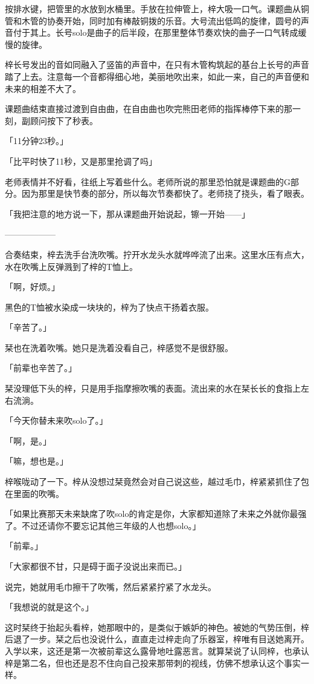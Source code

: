 \documentclass[UTF8]{ctexart}
\begin{document}
    按排水键，把管里的水放到水桶里。手放在拉伸管上，梓大吸一口气。课题曲从铜管和木管的协奏开始，同时加有棒敲铜拨的乐音。大号流出低鸣的旋律，圆号的声音付于其上。长号solo是曲子的后半段，在那里整体节奏欢快的曲子一口气转成缓慢的旋律。

    梓长号发出的音如同融入了竖笛的声音中，在只有木管构筑起的基台上长号的声音踏了上去。注意每一个音都得细心地，美丽地吹出来，如此一来，自己的声音便和未来的相差不大了。

    课题曲结束直接过渡到自由曲，在自由曲也吹完熊田老师的指挥棒停下来的那一刻，副顾问按下了秒表。

    「11分钟23秒。」

    「比平时快了11秒，又是那里抢调了吗」

    老师表情并不好看，往纸上写着些什么。老师所说的那里恐怕就是课题曲的G部分。因为那里是快节奏的部分，所以每次节奏都快了。老师挠了挠头，看了眼表。

    「我把注意的地方说一下，那从课题曲开始说起，镲一开始——」

    ——————

    合奏结束，梓去洗手台洗吹嘴。拧开水龙头水就哗哗流了出来。这里水压有点大，水在吹嘴上反弹溅到了梓的T恤上。

    「啊，好烦。」

    黑色的T恤被水染成一块块的，梓为了快点干扬着衣服。

    「辛苦了。」

    栞也在洗着吹嘴。她只是洗着没看自己，梓感觉不是很舒服。

    「前辈也辛苦了。」

    栞没理低下头的梓，只是用手指摩擦吹嘴的表面。流出来的水在栞长长的食指上左右流淌。

    「今天你替未来吹solo了。」

    「啊，是。」

    「嘛，想也是。」

    梓喉咙动了一下。梓从没想过栞竟然会对自己说这些，越过毛巾，梓紧紧抓住了包在里面的吹嘴。

    「如果比赛那天未来缺席了吹solo的肯定是你，大家都知道除了未来之外就你最强了。不过还请你不要忘记其他三年级的人也想solo。」

    「前辈。」

    「大家都很不甘，只是碍于面子没说出来而已。」

    说完，她就用毛巾擦干了吹嘴，然后紧紧拧紧了水龙头。

    「我想说的就是这个。」

    这时栞终于抬起头看梓，她那眼中的，是类似于嫉妒的神色。被她的气势压倒，梓后退了一步。栞之后也没说什么，直直走过梓走向了乐器室，梓唯有目送她离开。入学以来，这还是第一次被前辈这么露骨地吐露恶言。就算栞说了认同梓，也承认梓是第二名，但也还是忍不住向自己投来那带刺的视线，仿佛不想承认这个事实一样。
\end{document}
